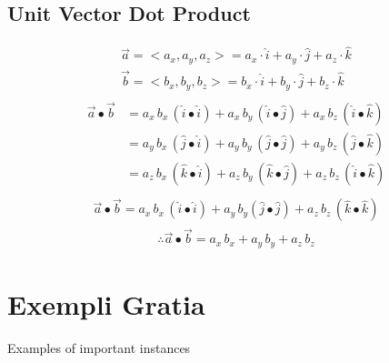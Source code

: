 \documentclass{article}
\begin{document}
\subsection{Unit Vector Dot Product}
\begin{gather*}
	\vec{a}=<a_x,a_y,a_z>=a_x\cdot\hat{i}+a_y\cdot\hat{j}+a_z\cdot\hat{k}\\
	\vec{b}=<b_x,b_y,b_z>=b_x\cdot\hat{i}+b_y\cdot\hat{j}+b_z\cdot\hat{k}\\
\end{gather*}
\begin{align*}
	\vec{a}\bullet\vec{b}&=a_x\,b_x\,(\hat{i}\bullet\hat{i})+a_x\,b_y\,(\hat{i}\bullet\hat{j})+a_x\,b_z\,(\hat{i}\bullet\hat{k})\\
						 &=a_y\,b_x\,(\hat{j}\bullet\hat{i})+a_y\,b_y\,(\hat{j}\bullet\hat{j})+a_y\,b_z\,(\hat{j}\bullet\hat{k})\\
						 &=a_z\,b_x\,(\hat{k}\bullet\hat{i})+a_z\,b_y\,(\hat{k}\bullet\hat{j})+a_z\,b_z\,(\hat{i}\bullet\hat{k})\\
\end{align*}
\begin{gather*}
	\vec{a}\bullet\vec{b}=a_x\,b_x\,(\hat{i}\bullet\hat{i})+a_y\,b_y(\hat{j}\bullet\hat{j})+a_z\,b_z\,(\hat{k}\bullet\hat{k})
\end{gather*}
\begin{gather*}
	\therefore\vec{a}\bullet\vec{b}=a_x\,b_x+a_y\,b_y+a_z\,b_z
\end{gather*}

\section{Exempli Gratia}

Examples of important instances
\end{document}
